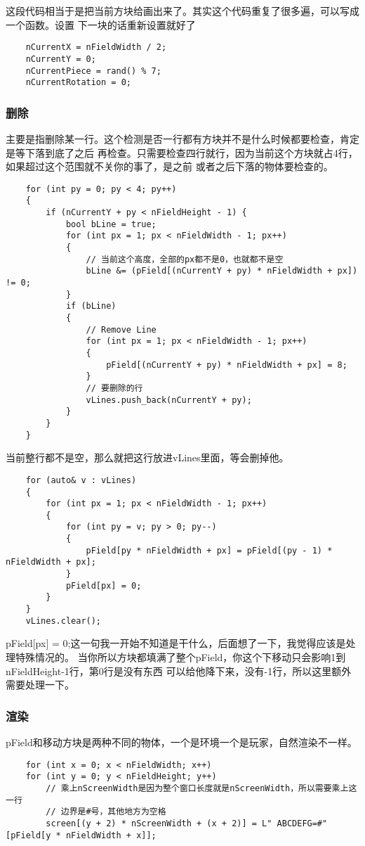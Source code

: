 \documentclass{article}
\begin{document}
\begin{sloppypar}
这段代码相当于是把当前方块给画出来了。其实这个代码重复了很多遍，可以写成一个函数。设置
下一块的话重新设置就好了
\begin{lstlisting}
	nCurrentX = nFieldWidth / 2;
	nCurrentY = 0;
	nCurrentPiece = rand() % 7;
	nCurrentRotation = 0;
\end{lstlisting}

\subsubsection{删除}
主要是指删除某一行。这个检测是否一行都有方块并不是什么时候都要检查，肯定是等下落到底了之后
再检查。只需要检查四行就行，因为当前这个方块就占4行，如果超过这个范围就不关你的事了，是之前
或者之后下落的物体要检查的。
\begin{lstlisting}
	for (int py = 0; py < 4; py++)
	{
		if (nCurrentY + py < nFieldHeight - 1) {
			bool bLine = true;
			for (int px = 1; px < nFieldWidth - 1; px++)
			{   
				// 当前这个高度，全部的px都不是0，也就都不是空
				bLine &= (pField[(nCurrentY + py) * nFieldWidth + px]) != 0;
			}
			if (bLine)
			{
				// Remove Line
				for (int px = 1; px < nFieldWidth - 1; px++)
				{
					pField[(nCurrentY + py) * nFieldWidth + px] = 8;
				}
				// 要删除的行
				vLines.push_back(nCurrentY + py);
			}
		}
	}
\end{lstlisting}
当前整行都不是空，那么就把这行放进vLines里面，等会删掉他。
\begin{lstlisting}
	for (auto& v : vLines)
	{
		for (int px = 1; px < nFieldWidth - 1; px++)
		{
			for (int py = v; py > 0; py--)
			{
				pField[py * nFieldWidth + px] = pField[(py - 1) * nFieldWidth + px];
			}
			pField[px] = 0;
		}
	}
	vLines.clear();
\end{lstlisting}
pField[px] = 0;这一句我一开始不知道是干什么，后面想了一下，我觉得应该是处理特殊情况的。
当你所以方块都填满了整个pField，你这个下移动只会影响1到nFieldHeight-1行，第0行是没有东西
可以给他降下来，没有-1行，所以这里额外需要处理一下。

\subsubsection{渲染}
pField和移动方块是两种不同的物体，一个是环境一个是玩家，自然渲染不一样。
\begin{lstlisting}
	for (int x = 0; x < nFieldWidth; x++)
	for (int y = 0; y < nFieldHeight; y++)
		// 乘上nScreenWidth是因为整个窗口长度就是nScreenWidth，所以需要乘上这一行
		// 边界是#号，其他地方为空格
		screen[(y + 2) * nScreenWidth + (x + 2)] = L" ABCDEFG=#"[pField[y * nFieldWidth + x]];


\end{lstlisting}
\end{sloppypar}
\end{document}
